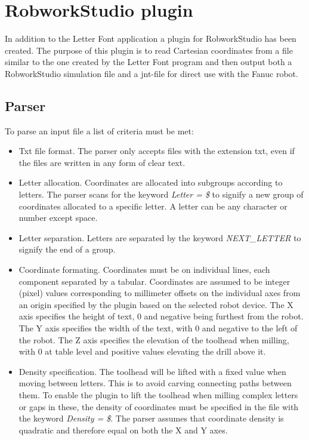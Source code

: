 \section{RobworkStudio plugin}
\label{sec:plugin}
In addition to the Letter Font application a plugin for RobworkStudio has been created. The purpose of this plugin is to read Cartesian coordinates from a file similar to the one created by the Letter Font program and then output both a RobworkStudio simulation file and a jnt-file for direct use with the Fanuc robot.

\subsection{Parser}
\label{sec:parser}
To parse an input file a list of criteria must be met:
\begin{itemize}
	\item Txt file format. The parser only accepts files with the extension txt, even if the files are written in any form of clear text. 
	\item Letter allocation. Coordinates are allocated into subgroups according to letters. The parser scans for the keyword \textit{Letter = \$} to signify a new group of coordinates allocated to a specific letter. A letter can be any character or number except space.
	\item Letter separation. Letters are separated by the keyword \textit{NEXT\_LETTER} to signify the end of a group.
	\item Coordinate formating. Coordinates must be on individual lines, each component separated by a tabular. Coordinates are assumed to be integer (pixel) values corresponding to millimeter offsets on the individual axes from an origin specified by the plugin based on the selected robot device. The X axis specifies the height of text, 0 and negative being furthest from the robot. The Y axis specifies the width of the text, with 0 and negative to the left of the robot. The Z axis specifies the elevation of the toolhead when milling, with 0 at table level and positive values elevating the drill above it.
	\item Density specification. The toolhead will be lifted with a fixed value when moving between letters. This is to avoid carving connecting paths between them. To enable the plugin to lift the toolhead when milling complex letters or gaps in these, the density of coordinates must be specified in the file with the keyword \textit{Density = \$}. The parser assumes that coordinate density is quadratic and therefore equal on both the X and Y axes.
\end{itemize}

